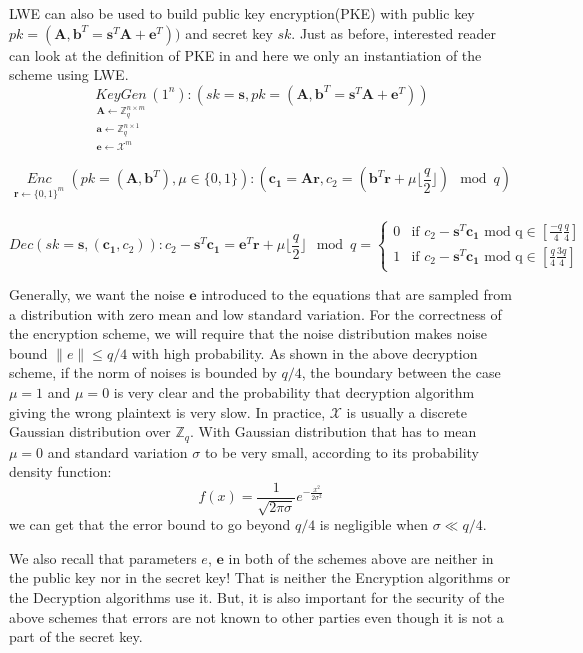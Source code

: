 \documentclass[usletter]{article}
\begin{document}
LWE can also be used to build public key encryption(PKE) with public key $pk = (\pmb{A}, \pmb{b}^T=\pmb{s}^T\pmb{A}+\pmb{e}^T))$ and secret key $sk$. Just as before, interested reader can look at the definition of PKE in  and here we only an instantiation of the scheme using LWE.
$$\underset{\substack{
\pmb{A}\leftarrow\mathbb{Z}_q^{n\times m}\\
\pmb{a}\leftarrow\mathbb{Z}_q^{n\times 1}\\
\pmb{e}\leftarrow\mathcal{X}^m}}{KeyGen}(1^n): (sk=\pmb{s},pk=(\pmb{A}, \pmb{b}^T=\pmb{s}^T\pmb{A}+\pmb{e}^T))$$


$$\underset{\substack{
\pmb{r}\leftarrow\{0,1\}^m\\}}{Enc}(pk = (\pmb{A}, \pmb{b}^T) ,\mu\in\{0,1\}): (\pmb{c_1}=\pmb{A}\pmb{r}, c_2=(\pmb{b}^T\pmb{r}+\mu\lfloor\frac{q}{2}\rfloor)\mod q)$$

$$Dec(sk=\pmb{s},(\pmb{c_1},c_2)): c_2-\pmb{s}^T\pmb{c_1}=\pmb{e}^T\pmb{r}+\mu\lfloor\frac{q}{2}\rfloor \mod q =  \begin{cases}
    0 & \text{if $c_2-\pmb{s}^T\pmb{c_1}$ mod q}  \in [\frac{-q}{4} \frac{q}{4} ] \\%
    1 & \text{if $c_2-\pmb{s}^T\pmb{c_1}$ mod q}  \in [\frac{q}{4} \frac{3q}{4} ]%
  \end{cases}$$
    
\begin{remark}
Generally, we want the noise $\pmb{e}$ introduced to the equations that are sampled from a distribution with zero mean and low standard variation. For the correctness of the encryption scheme, we will require that the noise distribution makes noise bound $\parallel e\parallel\leq q/4$ with high probability. As shown in the above decryption scheme, if the norm of noises is bounded by $q/4$, the boundary between the case $\mu=1$ and $\mu=0$ is very clear and the probability that decryption algorithm giving the wrong plaintext is very slow. In practice, $\mathcal{X}$ is usually a discrete Gaussian distribution over $\mathbb{Z}_q$. With Gaussian distribution that has to mean $\mu=0$ and standard variation $\sigma$ to be very small, according to its probability density function:
$$f(x)=\frac{1}{\sqrt{2\pi\sigma}}e^{-\frac{x^2}{2\sigma^2}}$$
we can get that the error bound to go beyond $q/4$ is negligible when $\sigma\ll q/4$.
\end{remark}

\begin{remark}
We also recall that parameters $e$, $\pmb{e}$ in both of the schemes above are neither in the public key nor in the secret key! That is neither the Encryption algorithms or the Decryption algorithms use it. But, it is also important for the security of the above schemes that errors are not known to other parties even though it is not a part of the secret key.
\end{remark}
\end{document}
